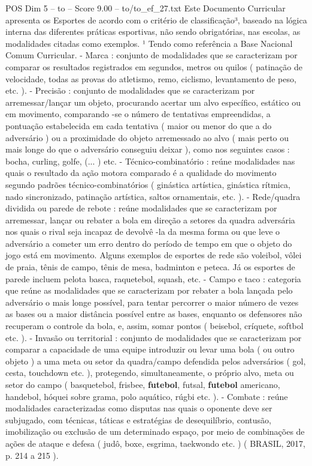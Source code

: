 \begin{textsample}{POS Dim 5 – to – Score 9.00 – to/to\_ef\_27.txt}
Este Documento Curricular apresenta os Esportes de acordo com o critério de classificação³, baseado na lógica interna das diferentes práticas esportivas, não sendo obrigatórias, nas escolas, as modalidades citadas como exemplos. ¹ Tendo como referência a Base Nacional Comum Curricular. - Marca : conjunto de modalidades que se caracterizam por comparar os resultados registrados em segundos, metros ou quilos ( patinação de velocidade, todas as provas do atletismo, remo, ciclismo, levantamento de peso, etc. ). - Precisão : conjunto de modalidades que se caracterizam por arremessar/lançar um objeto, procurando acertar um alvo específico, estático ou em movimento, comparando -se o número de tentativas empreendidas, a pontuação estabelecida em cada tentativa ( maior ou menor do que a do adversário ) ou a proximidade do objeto arremessado ao alvo ( mais perto ou mais longe do que o adversário conseguiu deixar ), como nos seguintes casos : bocha, curling, golfe, (... ) etc. - Técnico-combinatório : reúne modalidades nas quais o resultado da ação motora comparado é a qualidade do movimento segundo padrões técnico-combinatórios ( ginástica artística, ginástica rítmica, nado sincronizado, patinação artística, saltos ornamentais, etc. ). - Rede/quadra dividida ou parede de rebote : reúne modalidades que se caracterizam por arremessar, lançar ou rebater a bola em direção a setores da quadra adversária nos quais o rival seja incapaz de devolvê -la da mesma forma ou que leve o adversário a cometer um erro dentro do período de tempo em que o objeto do jogo está em movimento.
Alguns exemplos de esportes de rede são voleibol, vôlei de praia, tênis de campo, tênis de mesa, badminton e peteca.
Já os esportes de parede incluem pelota basca, raquetebol, squash, etc. - Campo e taco : categoria que reúne as modalidades que se caracterizam por rebater a bola lançada pelo adversário o mais longe possível, para tentar percorrer o maior número de vezes as bases ou a maior distância possível entre as bases, enquanto os defensores não recuperam o controle da bola, e, assim, somar pontos ( beisebol, críquete, softbol etc. ). - Invasão ou territorial : conjunto de modalidades que se caracterizam por comparar a capacidade de uma equipe introduzir ou levar uma bola ( ou outro objeto ) a uma meta ou setor da quadra/campo defendida pelos adversários ( gol, cesta, touchdown etc. ), protegendo, simultaneamente, o próprio alvo, meta ou setor do campo ( basquetebol, frisbee, \textbf{futebol}, futsal, \textbf{futebol} americano, handebol, hóquei sobre grama, polo aquático, rúgbi etc. ). - Combate : reúne modalidades caracterizadas como disputas nas quais o oponente deve ser subjugado, com técnicas, táticas e estratégias de desequilíbrio, contusão, imobilização ou exclusão de um determinado espaço, por meio de combinações de ações de ataque e defesa ( judô, boxe, esgrima, taekwondo etc. ) ( BRASIL, 2017, p. 214 a 215 ).

\end{textsample}
